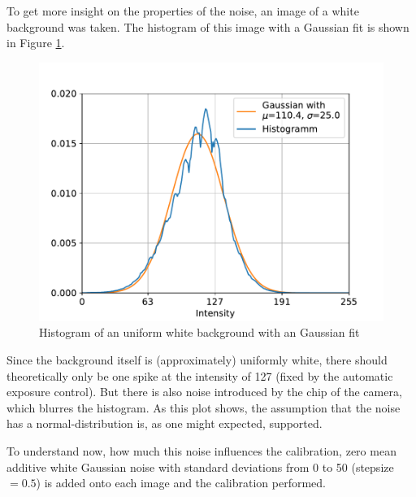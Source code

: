 To get more insight on the properties of the noise, an image of a white background was taken.
The histogram of this image with a Gaussian fit is shown in Figure \ref{development:noise_dist}.
\begin{figure}
	\centering
	\includegraphics[width=0.9\linewidth]{3-development/calibration/images/noise_distribution.pdf}
	\caption{Histogram of an uniform white background with an Gaussian fit\label{development:noise_dist}}
\end{figure}
Since the background itself is (approximately) uniformly white, there should theoretically only be one spike at the intensity of 127 (fixed by the automatic exposure control).
But there is also noise introduced by the chip of the camera, which blurres the histogram.
As this plot shows, the assumption that the noise has a normal-distribution is, as one might expected, supported.

To understand now, how much this noise influences the calibration, zero mean additive white Gaussian noise with standard deviations from 0 to 50 (stepsize $=0.5$) is added onto each image and the calibration performed. 



